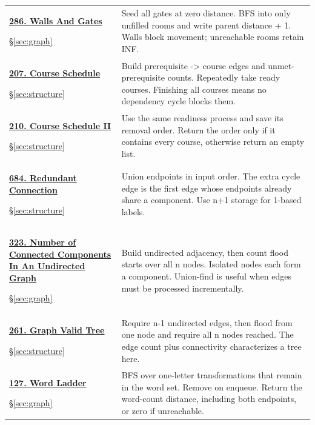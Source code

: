 \documentclass[11pt]{article}
\newcommand{\sect}[1]{\hyperref[sec:#1]{\S\ref*{sec:#1}}}
\begin{document}
\begin{longtable}{@{}L{4.3cm}L{11.7cm}@{}}
\hypertarget{lc286}{}\href{https://leetcode.com/problems/walls-and-gates/}{\textbf{286. Walls And Gates}}\par\sect{graph} & Seed all gates at zero distance. BFS into only unfilled rooms and write parent distance + 1. Walls block movement; unreachable rooms retain INF.\\[4pt]
\hypertarget{lc207}{}\href{https://leetcode.com/problems/course-schedule/}{\textbf{207. Course Schedule}}\par\sect{structure} & Build prerequisite -> course edges and unmet-prerequisite counts. Repeatedly take ready courses. Finishing all courses means no dependency cycle blocks them.\\[4pt]
\hypertarget{lc210}{}\href{https://leetcode.com/problems/course-schedule-ii/}{\textbf{210. Course Schedule II}}\par\sect{structure} & Use the same readiness process and save its removal order. Return the order only if it contains every course, otherwise return an empty list.\\[4pt]
\hypertarget{lc684}{}\href{https://leetcode.com/problems/redundant-connection/}{\textbf{684. Redundant Connection}}\par\sect{structure} & Union endpoints in input order. The extra cycle edge is the first edge whose endpoints already share a component. Use n+1 storage for 1-based labels.\\[4pt]
\hypertarget{lc323}{}\href{https://leetcode.com/problems/number-of-connected-components-in-an-undirected-graph/}{\textbf{323. Number of Connected Components In An Undirected Graph}}\par\sect{graph} & Build undirected adjacency, then count flood starts over all n nodes. Isolated nodes each form a component. Union-find is useful when edges must be processed incrementally.\\[4pt]
\hypertarget{lc261}{}\href{https://leetcode.com/problems/graph-valid-tree/}{\textbf{261. Graph Valid Tree}}\par\sect{structure} & Require n-1 undirected edges, then flood from one node and require all n nodes reached. The edge count plus connectivity characterizes a tree here.\\[4pt]
\hypertarget{lc127}{}\href{https://leetcode.com/problems/word-ladder/}{\textbf{127. Word Ladder}}\par\sect{graph} & BFS over one-letter transformations that remain in the word set. Remove on enqueue. Return the word-count distance, including both endpoints, or zero if unreachable.\\[4pt]
\bottomrule
\end{longtable}
\end{document}
